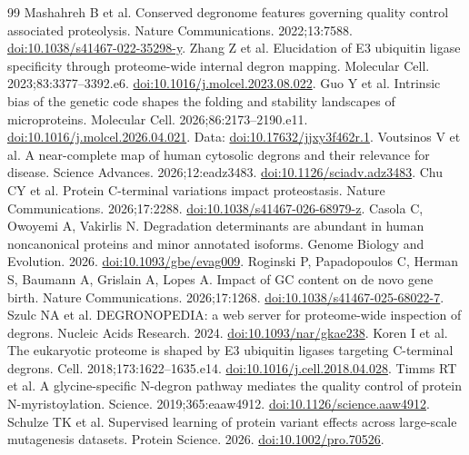 \documentclass[11pt,a4paper]{article}
\begin{document}
\begin{thebibliography}{99}
 Mashahreh B et al. Conserved degronome features governing quality control associated proteolysis. Nature Communications. 2022;13:7588. \href{https://doi.org/10.1038/s41467-022-35298-y}{doi:10.1038/s41467-022-35298-y}.
 Zhang Z et al. Elucidation of E3 ubiquitin ligase specificity through proteome-wide internal degron mapping. Molecular Cell. 2023;83:3377--3392.e6. \href{https://doi.org/10.1016/j.molcel.2023.08.022}{doi:10.1016/j.molcel.2023.08.022}.
 Guo Y et al. Intrinsic bias of the genetic code shapes the folding and stability landscapes of microproteins. Molecular Cell. 2026;86:2173--2190.e11. \href{https://doi.org/10.1016/j.molcel.2026.04.021}{doi:10.1016/j.molcel.2026.04.021}. Data: \href{https://doi.org/10.17632/jjxy3f462r.1}{doi:10.17632/jjxy3f462r.1}.
 Voutsinos V et al. A near-complete map of human cytosolic degrons and their relevance for disease. Science Advances. 2026;12:eadz3483. \href{https://doi.org/10.1126/sciadv.adz3483}{doi:10.1126/sciadv.adz3483}.
 Chu CY et al. Protein C-terminal variations impact proteostasis. Nature Communications. 2026;17:2288. \href{https://doi.org/10.1038/s41467-026-68979-z}{doi:10.1038/s41467-026-68979-z}.
 Casola C, Owoyemi A, Vakirlis N. Degradation determinants are abundant in human noncanonical proteins and minor annotated isoforms. Genome Biology and Evolution. 2026. \href{https://doi.org/10.1093/gbe/evag009}{doi:10.1093/gbe/evag009}.
 Roginski P, Papadopoulos C, Herman S, Baumann A, Grislain A, Lopes A. Impact of GC content on de novo gene birth. Nature Communications. 2026;17:1268. \href{https://doi.org/10.1038/s41467-025-68022-7}{doi:10.1038/s41467-025-68022-7}.
 Szulc NA et al. DEGRONOPEDIA: a web server for proteome-wide inspection of degrons. Nucleic Acids Research. 2024. \href{https://doi.org/10.1093/nar/gkae238}{doi:10.1093/nar/gkae238}.
 Koren I et al. The eukaryotic proteome is shaped by E3 ubiquitin ligases targeting C-terminal degrons. Cell. 2018;173:1622--1635.e14. \href{https://doi.org/10.1016/j.cell.2018.04.028}{doi:10.1016/j.cell.2018.04.028}.
 Timms RT et al. A glycine-specific N-degron pathway mediates the quality control of protein N-myristoylation. Science. 2019;365:eaaw4912. \href{https://doi.org/10.1126/science.aaw4912}{doi:10.1126/science.aaw4912}.
 Schulze TK et al. Supervised learning of protein variant effects across large-scale mutagenesis datasets. Protein Science. 2026. \href{https://doi.org/10.1002/pro.70526}{doi:10.1002/pro.70526}.

\end{thebibliography}
\end{document}
